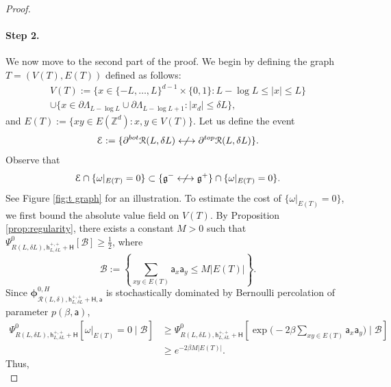 \documentclass[11pt,a4paper]{article}
\theoremstyle{definition}
\numberwithin{equation}{section}
\newcommand\fg{\mathfrak{g}}
\begin{document}
\begin{proof}
\paragraph{Step 2.} We now move to the second part of the proof.
We begin by defining the graph $T=(V(T),E(T))$ defined as follows: 
\begin{multline}
    V(T):= \Big\{x \in \{-L,\ldots ,L\}^{d-1}\times \{0,1\}: L-\log L\leq |x|\leq L\Big\}\\\cup \Big\{x \in \partial \Lambda_{L-\log L }\cup \partial \Lambda_{L-\log L +1}: |x_d|\leq \delta L\Big\},
\end{multline}
and $E(T):=\{xy\in E(\mathbb Z^d): x,y\in V(T)\}$. Let us define the event
\begin{equation}
\mathcal{E}:= \{\partial^{\rm bot} \mathcal R(L, \delta L)\centernot\longleftrightarrow \partial^{\rm top} \mathcal R(L, \delta L)\}.
\end{equation}
Observe that
\begin{equation}\label{eq:Tproofinclusion}
\mathcal{E}\cap \{\omega|_{E(T)}=0\} \subset \{\fg^{-}\centernot \longleftrightarrow \fg^{+}\}\cap \{\omega|_{E(T)}=0\}.
\end{equation}
See Figure \ref{fig:t graph} for an illustration. To estimate the cost of $\{\omega|_{E(T)}=0\}$, we first bound the absolute value field on $V(T)$.
By Proposition \ref{prop:regularity}, there exists a constant $M>0$ such that
$\Psi^{0}_{R(L,\delta L),\mathsf{h}^{+,+}_{L,\delta L}+\mathsf{H}}[\mathcal{B}]\geq \frac{1}{2}$,
where
\begin{equation}
\mathcal{B}:=\left\{\sum_{xy\in E(T)} \mathsf{a}_x \mathsf{a}_y\leq M |E(T)|\right\}. \end{equation}
Since $\boldsymbol{\phi}^{0,H}_{\mathcal{R}(L,\delta),\mathsf{h}^{+,+}_{L,\delta L}+\mathsf{H},\mathsf{a}}$ is stochastically dominated by Bernoulli percolation of parameter $p(\beta,\mathsf{a})$,
\begin{equation}\label{eq: close edges}
\begin{aligned}
\Psi^{0}_{R(L,\delta L),\mathsf{h}^{+,+}_{L,\delta L}+\mathsf{H}}[\omega|_{E(T)}=0 \mid \mathcal{B}]&\geq \Psi^{0}_{R(L,\delta L),\mathsf{h}^{+,+}_{L,\delta L}+\mathsf{H}}\left[\exp\Big(-2\beta\sum _{xy\in E(T)} \mathsf{a}_x \mathsf{a}_y\Big)\mid \mathcal{B}\right]
\\&\geq e^{-2\beta M |E(T)|}.
\end{aligned}
\end{equation}
Thus,
\begin{equation}\label{eq: comparison 4}

\end{equation}
\end{proof}
\end{document}
